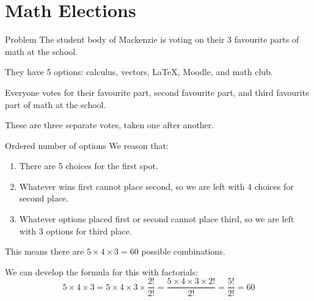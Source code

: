 	\section{Math Elections}
	\begin{namedframe}{Problem}
		The student body of Mackenzie is voting on their 3 favourite parts of math at the school.

		They have 5 options: calculus, vectors, \textrm{\LaTeX{}}, Moodle, and math club.

		Everyone votes for their favourite part, second favourite part, and third favourite part of math at the school.

		These are three separate votes, taken one after another.
	\end{namedframe}
	\begin{namedframe}{Ordered number of options}
		We reason that:
		\begin{enumerate}[<+(1)->]
			\item There are 5 choices for the first spot.
			\item Whatever wins first cannot place second, so we are left with 4 choices for second place.
			\item Whatever options placed first or second cannot place third, so we are left with 3 options for third place.
		\end{enumerate}
		\pause
		This means there are $5 \times 4 \times 3 = 60$ possible combinations.
		
		We can develop the formula for this with factorials:
		\[5 \times 4 \times 3 = 5 \times 4 \times 3 \times \frac{2!}{2!} = \frac{5 \times 4 \times 3 \times 2!}{2!} = \frac{5!}{2!} = 60\]
	\end{namedframe}
